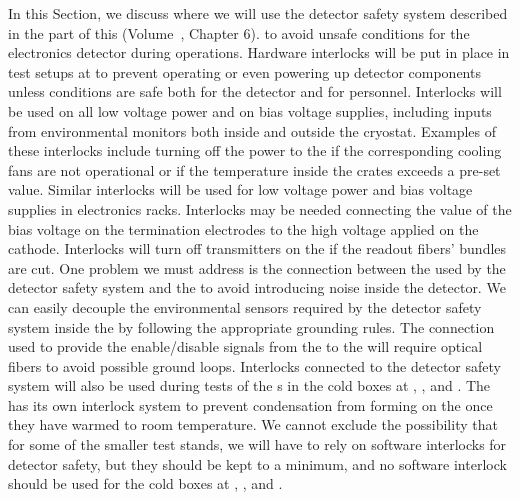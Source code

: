 In this Section, we discuss where we will use
the detector safety system described in the \voltitletc
part of this  (Volume~\volnumbertc, Chapter 6). %
to avoid unsafe conditions for the  electronics detector 
during operations. Hardware interlocks will be put in place
in test setups at  to prevent operating or even powering up
detector components 
unless conditions are safe
both for the detector and for personnel. Interlocks will be
used on all low voltage power and on bias voltage 
supplies, including inputs from environmental monitors both
inside and outside the cryostat. Examples of these interlocks include turning off the power to the 
if the corresponding cooling fans are not operational or
if the temperature inside the crates exceeds a pre-set value.
Similar interlocks will be used for low voltage power
and bias voltage supplies in  electronics racks.
Interlocks may be needed connecting the value of the 
bias voltage on the  termination electrodes to the
high voltage applied on the  cathode. Interlocks will turn 
off transmitters on the  if the readout fibers'
bundles are cut. One problem we must address is 
the connection between the  used by the detector 
safety system and the  to avoid introducing noise 
inside the detector. We can easily decouple the environmental 
sensors required by the detector safety system inside the 
 by following the appropriate grounding rules. 
The connection used to provide the enable/disable signals 
from the  to the  will require optical 
fibers to avoid possible ground loops. Interlocks connected
to the detector safety system will also be used during tests 
of the s in the cold boxes at , ,
and . The  has its own interlock system to
prevent condensation from forming on the  once
they have warmed to room temperature. We cannot exclude the possibility that for some of the smaller test stands, we will 
have to rely on software interlocks for detector safety,
but they should be kept to a minimum, and no software
interlock should be used for the cold boxes at
, ,
and .
